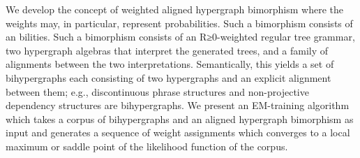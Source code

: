 We develop the concept of weighted aligned hypergraph bimorphism where the weights may, in particular, represent probabilities. Such a bimorphism consists of an bilities. Such a bimorphism consists of an R≥0-weighted regular tree grammar, two hypergraph algebras that interpret the generated trees, and a family of alignments between the two interpretations. Semantically, this yields a set of bihypergraphs each consisting of two hypergraphs and an explicit alignment between them; e.g., discontinuous phrase structures and non-projective dependency structures are bihypergraphs. We present an EM-training algorithm which takes a corpus of bihypergraphs and an aligned hypergraph bimorphism as input and generates a sequence of weight assignments which converges to a local maximum or saddle point of the likelihood function of the corpus.
